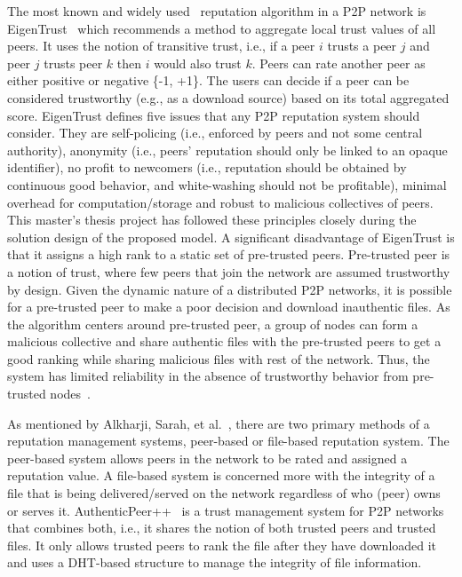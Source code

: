 The most known and widely used~\cite{chiluka2012personalizing} reputation
algorithm in a P2P network is EigenTrust~\cite{kamvar2003eigentrust} which
recommends a method to aggregate local trust values of all peers. It uses the
notion of transitive trust, i.e., if a peer $i$ trusts a peer $j$ and peer $j$
trusts peer $k$ then $i$ would also trust $k$. Peers can rate another peer as
either positive or negative \{-1, +1\}. The users can decide if a peer can be
considered trustworthy (e.g., as a download source) based on its total
aggregated score. EigenTrust defines five issues that any P2P reputation system
should consider. They are self-policing (i.e., enforced by peers and not some
central authority), anonymity (i.e., peers' reputation should only be linked to
an opaque identifier), no profit to newcomers (i.e., reputation should be
obtained by continuous good behavior, and white-washing should not be
profitable), minimal overhead for computation/storage and robust to malicious
collectives of peers. This master's thesis project has followed these
principles closely during the solution design of the proposed model. A
significant disadvantage of EigenTrust is that it assigns a high rank to a
static set of pre-trusted peers. Pre-trusted peer is a notion of trust, where
few peers that join the network are assumed trustworthy by design.  Given the
dynamic nature of a distributed P2P networks, it is possible for a pre-trusted
peer to make a poor decision and download inauthentic files. As the algorithm
centers around pre-trusted peer, a group of nodes can form a malicious
collective and share authentic files with the pre-trusted peers to get a good
ranking while sharing malicious files with rest of the network. Thus, the
system has limited reliability in the absence of trustworthy behavior from
pre-trusted nodes~\cite{chiluka2012personalizing}.\par

As mentioned by Alkharji, Sarah, et al.~\cite{alkharji2017authenticpeer++},
there are two primary methods of a reputation management systems, peer-based or
file-based reputation system. The peer-based system allows peers in the network
to be rated and assigned a reputation value. A file-based system is concerned
more with the integrity of a file that is being delivered/served on the network
regardless of who (peer) owns or serves it.
AuthenticPeer++~\cite{alkharji2017authenticpeer++} is a trust management system
for P2P networks that combines both, i.e., it shares the notion of both trusted
peers and trusted files. It only allows trusted peers to rank the file after
they have downloaded it and uses a DHT-based structure to manage the integrity
of file information. \par

